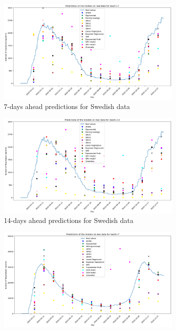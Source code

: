 \begin{figure}[h!]
    \centering
    \begin{subfigure}[b]{0.5\textwidth}
        \centering
        \includegraphics[width=\textwidth]{figures/real_data_sweden_7.png}  
        \caption{7-days ahead predictions for Swedish data}
        \label{fig:sousfig1g}
      \end{subfigure}
      \hfill
      \begin{subfigure}[b]{0.5\textwidth}
        \centering
        \includegraphics[width=\textwidth]{figures/real_data_sweden_14.png}  
        \caption{14-days ahead predictions for Swedish data}
        \label{fig:sousfig2g}
      \end{subfigure}
      \begin{subfigure}[b]{0.5\textwidth}
        \centering
        \includegraphics[width=\textwidth]{figures/real_data_France_7.png}  

\end{subfigure}
\end{figure}
